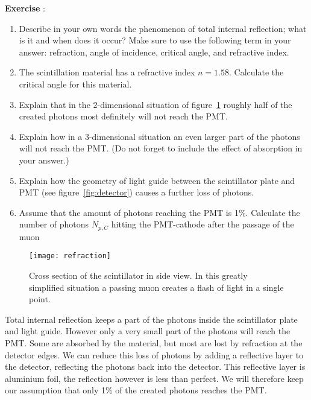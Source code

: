 \begin{shaded}
\textbf{Exercise \theExercise {}} :
\begin{enumerate}[-]
\item Describe in your own words the phenomenon of total internal reflection; what is it and when does it occur? Make sure to use the following term in your answer: refraction, angle of incidence, critical angle, and refractive index.
\item The scintillation material has a refractive index $n=1.58$. Calculate the critical angle for this material.
\item Explain that in the 2-dimensional situation of figure~\ref{fig:refraction} roughly half of the created photons most definitely will not reach the PMT.
\item Explain how in a 3-dimensional situation an even larger part of the photons will not reach the PMT. (Do not forget to include the effect of absorption in your answer.)
\item Explain how the geometry of light guide between the scintillator plate and PMT (see figure~\ref{fig:detector}) causes a further loss of photons.
\item Assume that the amount of photons reaching the PMT is 1\%. Calculate the number of photons $N_{p,C}$ hitting the PMT-cathode after the passage of the muon
\end{enumerate}
\end{shaded}

\begin{figure}\begin{center}
\texttt{[image: refraction]}%
\caption{Cross section of the scintillator in side view. In this greatly simplified situation a passing muon creates a flash of light in a single point.}\label{fig:refraction}
\end{center}\end{figure}

Total internal reflection keeps a part of the photons inside the scintillator plate and light guide. However only a very small part of the photons will reach the PMT. Some are absorbed by the material, but most are lost by refraction at the detector edges. We can reduce this loss of photons by adding a reflective layer to the detector, reflecting the photons back into the detector. This reflective layer is aluminium foil, the reflection however is less than perfect. We will therefore keep our assumption that only 1\% of the created photons reaches the PMT.

